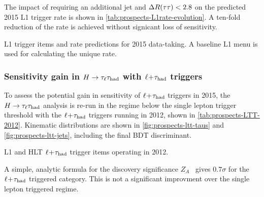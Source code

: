 \clearpage

The impact of requiring an additional jet and $\Delta R(\tau\tau) < 2.8$ on the predicted 2015 L1 trigger rate is shown in \cref{tab:prospects-L1rate-evolution}. A ten-fold reduction of the rate is achieved without signicant loss of sensitivity.

\begin{table}[!htpb] 
  \centering
  \renewcommand{\arraystretch}{1.4}
  \caption{L1 trigger items and rate predictions for 2015 data-taking. A baseline L1 menu is used for calculating the unique rate.}
  
  \label{tab:prospects-L1rate-evolution}
\end{table}

\subsubsection{Sensitivity gain in $H\rightarrow\tau_\ell\tau_\text{had}$ with $\ell\!+\!\tau_\text{had}$ triggers}

To assess the potential gain in sensitivity of $\ell\!+\!\tau_\text{had}$ triggers in 2015, the $H\rightarrow\tau_\ell\tau_\text{had}$ analysis is re-run in the regime below the single lepton trigger threshold with the $\ell\!+\!\tau_\text{had}$ triggers running in 2012, shown in \cref{tab:prospects-LTT-2012}. Kinematic distributions are shown in \cref{fig:prospects-ltt-taus} and \cref{fig:prospects-ltt-jets}, including the final BDT discriminant.

\begin{table}[!htpb] 
  \centering
  \renewcommand{\arraystretch}{1.4}
  \caption{L1 and HLT $\ell\!+\!\tau_\text{had}$ trigger items operating in 2012.}
  
  \label{tab:prospects-LTT-2012}
\end{table}

A simple, analytic formula for the discovery significance $Z_A$~\cite{2012.cowan.significance} gives $0.7\sigma$ for the $\ell\!+\!\tau_\text{had}$ triggered category. This is not a significant improvment over the single lepton triggered regime.

